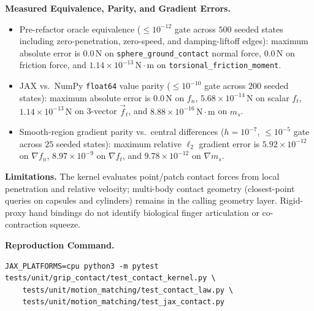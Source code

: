 \documentclass[11pt,a4paper]{article}
\begin{document}
\textbf{Measured Equivalence, Parity, and Gradient Errors.}
\begin{itemize}[leftmargin=*,noitemsep]
\item Pre-refactor oracle equivalence ($\le 10^{-12}$ gate across $500$ seeded states including zero-penetration, zero-speed, and damping-liftoff edges): maximum absolute error is $0.0\,\mathrm{N}$ on \texttt{sphere\_ground\_contact} normal force, $0.0\,\mathrm{N}$ on friction force, and $1.14 \times 10^{-13}\,\mathrm{N\cdot m}$ on \texttt{torsional\_friction\_moment}.
\item JAX vs.\ NumPy \texttt{float64} value parity ($\le 10^{-10}$ gate across $200$ seeded states): maximum absolute error is $0.0\,\mathrm{N}$ on $f_n$, $5.68 \times 10^{-14}\,\mathrm{N}$ on scalar $f_t$, $1.14 \times 10^{-13}\,\mathrm{N}$ on 3-vector $\vec{f}_t$, and $8.88 \times 10^{-16}\,\mathrm{N\cdot m}$ on $m_s$.
\item Smooth-region gradient parity vs.\ central differences ($h = 10^{-7}$, $\le 10^{-5}$ gate across $25$ seeded states): maximum relative $\ell_2$ gradient error is $5.92 \times 10^{-12}$ on $\nabla f_n$, $8.97 \times 10^{-9}$ on $\nabla f_t$, and $9.78 \times 10^{-12}$ on $\nabla m_s$.
\end{itemize}

\textbf{Limitations.}
The kernel evaluates point/patch contact forces from local penetration and relative velocity; multi-body contact geometry (closest-point queries on capsules and cylinders) remains in the calling geometry layer. Rigid-proxy hand bindings do not identify biological finger articulation or co-contraction squeeze.

\textbf{Reproduction Command.}
\begin{verbatim}
JAX_PLATFORMS=cpu python3 -m pytest tests/unit/grip_contact/test_contact_kernel.py \
    tests/unit/motion_matching/test_contact_law.py \
    tests/unit/motion_matching/test_jax_contact.py
\end{verbatim}
\end{document}
